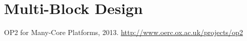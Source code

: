 \documentclass[11pt]{article}
\begin{document}
\section{Multi-Block Design}



\begin{thebibliography}{1}
 OP2 for Many-Core Platforms, 2013. \url{http://www.oerc.ox.ac.uk/projects/op2}
\end{thebibliography}
\end{document}
